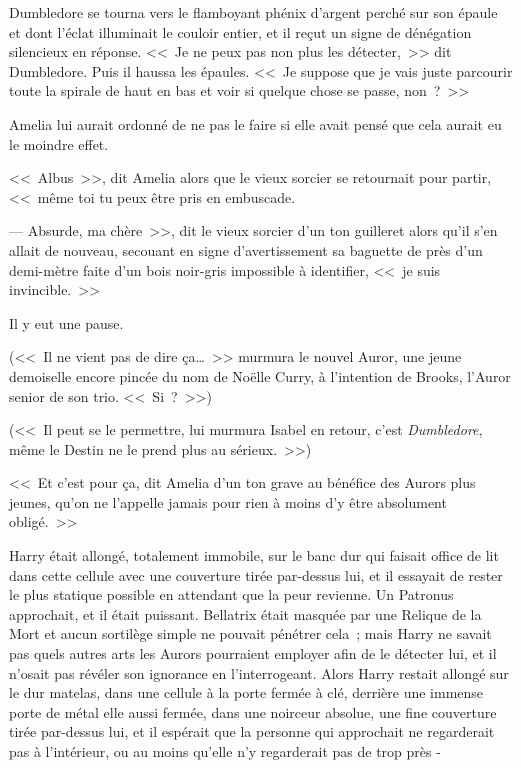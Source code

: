 Dumbledore se tourna vers le flamboyant phénix d'argent perché sur son épaule et dont l'éclat illuminait le couloir entier, et il reçut un signe de dénégation silencieux en réponse. <<~Je ne peux pas non plus les détecter,~>> dit Dumbledore. Puis il haussa les épaules. <<~Je suppose que je vais juste parcourir toute la spirale de haut en bas et voir si quelque chose se passe, non~?~>>

Amelia lui aurait ordonné de ne pas le faire si elle avait pensé que cela aurait eu le moindre effet.

<<~Albus~>>, dit Amelia alors que le vieux sorcier se retournait pour partir, <<~même toi tu peux être pris en embuscade.

--- Absurde, ma chère~>>, dit le vieux sorcier d'un ton guilleret alors qu'il s'en allait de nouveau, secouant en signe d'avertissement sa baguette de près d'un demi-mètre faite d'un bois noir-gris impossible à identifier, <<~je suis invincible.~>>

Il y eut une pause.

(<<~Il ne vient pas de dire ça…~>> murmura le nouvel Auror, une jeune demoiselle encore pincée du nom de Noëlle Curry, à l'intention de Brooks, l'Auror senior de son trio. <<~Si~?~>>)

(<<~Il peut se le permettre, lui murmura Isabel en retour, c'est \emph{Dumbledore}, même le Destin ne le prend plus au sérieux.~>>)

<<~Et c'est pour ça, dit Amelia d'un ton grave au bénéfice des Aurors plus jeunes, qu'on ne l'appelle jamais pour rien à moins d'y être absolument obligé.~>>

\later

Harry était allongé, totalement immobile, sur le banc dur qui faisait office de lit dans cette cellule avec une couverture tirée par-dessus lui, et il essayait de rester le plus statique possible en attendant que la peur revienne. Un Patronus approchait, et il était puissant. Bellatrix était masquée par une Relique de la Mort et aucun sortilège simple ne pouvait pénétrer cela~; mais Harry ne savait pas quels autres arts les Aurors pourraient employer afin de le détecter lui, et il n'osait pas révéler son ignorance en l'interrogeant. Alors Harry restait allongé sur le dur matelas, dans une cellule à la porte fermée à clé, derrière une immense porte de métal elle aussi fermée, dans une noirceur absolue, une fine couverture tirée par-dessus lui, et il espérait que la personne qui approchait ne regarderait pas à l'intérieur, ou au moins qu'elle n'y regarderait pas de trop près -

